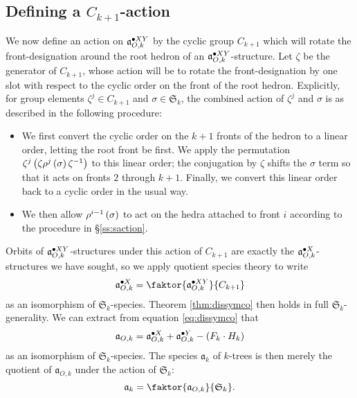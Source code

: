 \documentclass[sectionflow,singlespace,twoside]{brandiss} %
\numberwithin{section}{chapter}
\numberwithin{figure}{chapter}
\begin{document}
\subsection{Defining a $C_{k+1}$-action}\label{ss:zaction}
We now define an action on $\pointed[XY]{\mathfrak{a}}_{O, k}$ by the cyclic group $C_{k+1}$ which will rotate the front-designation around the root hedron of an $\pointed[XY]{\mathfrak{a}}_{O, k}$-structure.
Let $\zeta$ be the generator of $C_{k+1}$, whose action will be to rotate the front-designation by one slot with respect to the cyclic order on the front of the root hedron.
Explicitly, for group elements $\zeta^{j} \in C_{k+1}$ and $\sigma \in \mathfrak{S}_{k}$, the combined action of $\zeta^{j}$ and $\sigma$ is as described in the following procedure:
\begin{itemize}
\item We first convert the cyclic order on the $k+1$ fronts of the hedron to a linear order, letting the root front be first.
  We apply the permutation $\zeta^{j} \pbrac{\zeta \rho^{j} \pbrac{\sigma} \zeta^{-1}}$ to this linear order; the conjugation by $\zeta$ shifts the $\sigma$ term so that it acts on fronts $2$ through $k+1$.
  Finally, we convert this linear order back to a cyclic order in the usual way.  
\item We then allow $\rho^{i - 1} \pbrac{\sigma}$ to act on the hedra attached to front $i$ according to the procedure in \S \ref{ss:saction}.
\end{itemize}
Orbits of $\pointed[XY]{\mathfrak{a}}_{O, k}$-structures under this action of $C_{k+1}$ are exactly the $\pointed[X]{\mathfrak{a}}_{O, k}$-structures we have sought, so we apply quotient species theory to write
\begin{equation}
  \label{eq:cycquot}
  \pointed[X]{\mathfrak{a}}_{O, k} = \faktor{\pointed[XY]{\mathfrak{a}}_{O, k}}{C_{k+1}}
\end{equation}
as an isomorphism of $\mathfrak{S}_{k}$-species.
Theorem \ref{thm:dissymco} then holds in full $\mathfrak{S}_{k}$-generality.
We can extract from equation \eqref{eq:dissymco} that
\begin{equation}
  \label{eq:coskextract}
  \mathfrak{a}_{O, k} = \pointed[X]{\mathfrak{a}}_{O, k} + \pointed[Y]{\mathfrak{a}}_{O, k} - \pbrac{F_{k} \cdot H_{k}}
\end{equation}
as an isomorphism of $\mathfrak{S}_{k}$-species.
The species $\mathfrak{a}_{k}$ of $k$-trees is then merely the quotient of $\mathfrak{a}_{O, k}$ under the action of $\mathfrak{S}_{k}$:
\begin{equation}
  \label{eq:ktreesquot}
  \mathfrak{a}_{k} = \faktor{\mathfrak{a}_{O, k}}{\mathfrak{S}_{k}}.
\end{equation}
\end{document}

